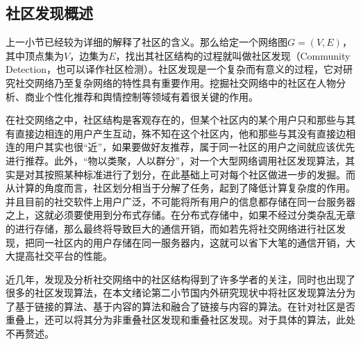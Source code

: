 \subsection{社区发现概述}
上一小节已经较为详细的解释了社区的含义。那么给定一个网络图$G=(V,E)$，其中顶点集为$V$，边集为$E$，找出其社区结构的过程就叫做社区发现（Community Detection，也可以译作社区检测）。社区发现是一个复杂而有意义的过程，它对研究社交网络乃至复杂网络的特性具有重要作用。挖掘社交网络中的社区在人物分析、商业个性化推荐和舆情控制等领域有着很关键的作用。

在社交网络之中，社区结构是客观存在的，但某个社区内的某个用户只和那些与其有直接边相连的用户产生互动，殊不知在这个社区内，他和那些与其没有直接边相连的用户其实也很“近”，如果要做好友推荐，属于同一社区的用户之间就应该优先进行推荐。此外，“物以类聚，人以群分”，对一个大型网络调用社区发现算法，其实是对其按照某种标准进行了划分，在此基础上可对每个社区做进一步的发掘。而从计算的角度而言，社区划分相当于分解了任务，起到了降低计算复杂度的作用。并且目前的社交软件上用户广泛，不可能将所有用户的信息都存储在同一台服务器之上，这就必须要使用到分布式存储。在分布式存储中，如果不经过分类杂乱无章的进行存储，那么最终将导致巨大的通信开销，而如若先将社交网络进行社区发现，把同一社区内的用户存储在同一服务器内，这就可以省下大笔的通信开销，大大提高社交平台的性能。

近几年，发现及分析社交网络中的社区结构得到了许多学者的关注，同时也出现了很多的社区发现算法，在本文绪论第二小节国内外研究现状中将社区发现算法分为了基于链接的算法、基于内容的算法和融合了链接与内容的算法。在针对社区是否重叠上，还可以将其分为非重叠社区发现和重叠社区发现。对于具体的算法，此处不再赘述。





